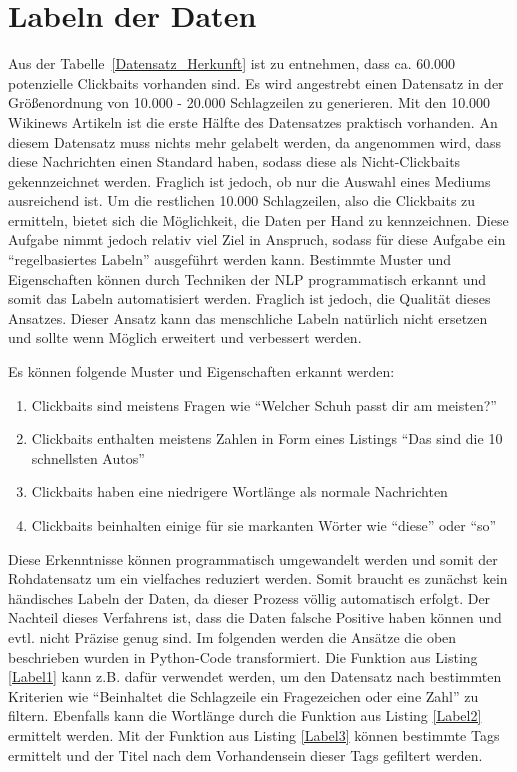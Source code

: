 \section{Labeln der Daten}\label{secLabel}
Aus der Tabelle~\ref{Datensatz_Herkunft} ist zu entnehmen, dass ca. 60.000 potenzielle Clickbaits vorhanden sind. Es wird angestrebt einen Datensatz in der Größenordnung von 10.000 - 20.000 Schlagzeilen zu generieren. Mit den 10.000 Wikinews Artikeln ist die erste Hälfte des Datensatzes praktisch vorhanden. An diesem Datensatz muss nichts mehr gelabelt werden, da angenommen wird, dass diese Nachrichten einen Standard haben, sodass diese als Nicht-Clickbaits gekennzeichnet werden. Fraglich ist jedoch, ob nur die Auswahl eines Mediums ausreichend ist. Um die restlichen 10.000 Schlagzeilen, also die Clickbaits zu ermitteln, bietet sich die Möglichkeit, die Daten per Hand zu kennzeichnen. Diese Aufgabe nimmt jedoch relativ viel Ziel in Anspruch, sodass für diese Aufgabe ein \enquote{regelbasiertes Labeln} ausgeführt werden kann. Bestimmte Muster und Eigenschaften können durch Techniken der NLP programmatisch erkannt und somit das Labeln automatisiert werden. Fraglich ist jedoch, die Qualität dieses Ansatzes. Dieser Ansatz kann das menschliche Labeln natürlich nicht ersetzen und sollte wenn Möglich erweitert und verbessert werden.

Es können folgende Muster und Eigenschaften erkannt werden:

\begin{enumerate}
    \item Clickbaits sind meistens Fragen wie \enquote{Welcher Schuh passt dir am meisten?}
    \item Clickbaits enthalten meistens Zahlen in Form eines Listings \enquote{Das sind die 10 schnellsten Autos}
    \item Clickbaits haben eine niedrigere Wortlänge als normale Nachrichten
    \item Clickbaits beinhalten einige für sie markanten Wörter wie \enquote{diese} oder \enquote{so}
\end{enumerate}

Diese Erkenntnisse können programmatisch umgewandelt werden und somit der Rohdatensatz um ein vielfaches reduziert werden. Somit braucht es zunächst kein händisches Labeln der Daten, da dieser Prozess völlig automatisch erfolgt. Der Nachteil dieses Verfahrens ist, dass die Daten falsche Positive haben können und evtl. nicht Präzise genug sind. Im folgenden werden die Ansätze die oben beschrieben wurden in Python-Code transformiert. Die Funktion aus Listing \ref{Label1} kann z.B. dafür verwendet werden, um den Datensatz nach bestimmten Kriterien wie \enquote{Beinhaltet die Schlagzeile ein Fragezeichen oder eine Zahl} zu filtern. Ebenfalls kann die Wortlänge durch die Funktion aus Listing \ref{Label2} ermittelt werden. Mit der Funktion aus Listing \ref{Label3} können bestimmte Tags ermittelt und der Titel nach dem Vorhandensein dieser Tags gefiltert werden. 


